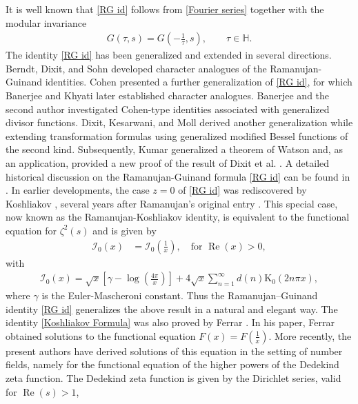 \documentclass[12pt,reqno]{amsart}
\renewcommand{\Re}{\operatorname{Re}}
\renewcommand{\(}{\left\(}
\renewcommand{\)}{\right\)}
\renewcommand{\[}{\left\[}
\renewcommand{\]}{\right\]}
\numberwithin{equation}{section}
\theoremstyle{plain}
\begin{document}
It is well known that \eqref{RG id} follows from \eqref{Fourier series} together with the modular invariance
\begin{align*}
G(\tau,s)=G\!\left(-\frac{1}{\tau},s\right), \qquad \tau\in\mathbb{H}.
\end{align*}
The identity \eqref{RG id} has been generalized and extended in several directions. Berndt, Dixit, and Sohn \cite{BDS} developed character analogues of the Ramanujan-Guinand identities. Cohen \cite{Cohen} presented a further generalization of \eqref{RG id}, for which Banerjee and Khyati \cite{BK24} later established character analogues. Banerjee and the second author \cite{BM23} investigated Cohen-type identities associated with generalized divisor functions. Dixit, Kesarwani, and Moll \cite{DKM18} derived another generalization while extending transformation formulas using generalized modified Bessel functions of the second kind. Subsequently, Kumar \cite{Kumar} generalized a theorem of Watson and, as an application, provided a new proof of the result of Dixit et al. \cite{DKM18}. A detailed historical discussion on the Ramanujan-Guinand formula \eqref{RG id} can be found in \cite{BLS}. In earlier developments, the case $z=0$ of \eqref{RG id}  was rediscovered by Koshliakov \cite{Koshliakov}, several years after Ramanujan’s original entry \cite[p.~253]{Ramanujan}. This special case, now known as the Ramanujan-Koshliakov identity, is equivalent to the functional equation for $\zeta^2(s)$ and is given by
\begin{align}\label{Koshliakov Formula}
\mathcal{I}_{0}(x) &= \mathcal{I}_{0}\left(\frac{1}{x}\right), \quad \text{for} \,\, \Re(x) > 0,
\end{align}
with
\begin{align*}
\mathcal{I}_{0}(x) = \sqrt{x}\left[\gamma - \log\left(\frac{4\pi}{x}\right)\right] + 4\sqrt{x}\sum_{n=1}^{\infty}d(n)\text{K}_0(2n\pi x),
\end{align*}
where $\gamma$ is the Euler-Mascheroni constant.
Thus the Ramanujan–Guinand identity \eqref{RG id} generalizes the above result in a natural and elegant way. The identity \eqref{Koshliakov Formula} was also proved by Ferrar \cite{Ferrar1936}. In his paper, Ferrar obtained solutions to the functional equation $F(x) = F\left(\frac{1}{x}\right)$. More recently, the present authors \cite{BM2} have derived solutions of this equation in the setting of number fields, namely for the functional equation of the higher powers of the Dedekind zeta function. The Dedekind zeta function is given by the Dirichlet series, valid for $\Re(s) > 1$,
\end{document}
